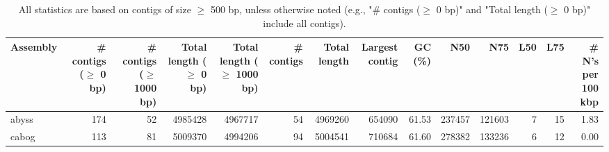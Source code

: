 \documentclass[12pt,a4paper]{article}
\begin{document}
\begin{table}[ht]
\begin{center}
\caption{All statistics are based on contigs of size $\geq$ 500 bp, unless otherwise noted (e.g., "\# contigs ($\geq$ 0 bp)" and "Total length ($\geq$ 0 bp)" include all contigs).}
\begin{tabular}{|l*{13}{|r}|}
\hline
Assembly & \# contigs ($\geq$ 0 bp) & \# contigs ($\geq$ 1000 bp) & Total length ($\geq$ 0 bp) & Total length ($\geq$ 1000 bp) & \# contigs & Total length & Largest contig & GC (\%) & N50 & N75 & L50 & L75 & \# N's per 100 kbp \\ \hline
abyss & 174 & 52 & 4985428 & 4967717 & 54 & 4969260 & 654090 & 61.53 & 237457 & 121603 & 7 & 15 & 1.83 \\ \hline
cabog & 113 & 81 & 5009370 & 4994206 & 94 & 5004541 & 710684 & 61.60 & 278382 & 133236 & 6 & 12 & 0.00 \\ \hline
\end{tabular}
\end{center}
\end{table}
\end{document}
